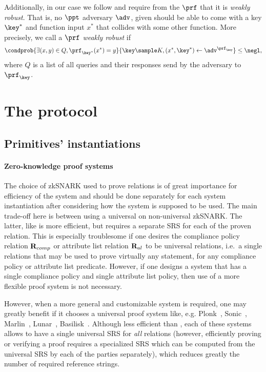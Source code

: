 \documentclass[runningheads,10pt]{llncs}
\numberwithin{equation}{section}
\begin{document}
Additionally, in our case we follow \cite{EPRINT:DGKOS20} and require from the
$\prf$ that it is \emph{weakly robust}. That is, no $\ppt$ adversary $\adv$,
given should be able to come with a key $\key^*$ and function input $x^*$ that
collides with some other function. More precisely, we call a $\prf$ \emph{weakly robust} if
\[
\condprob{\exists (x, y) \in Q, \prf_{\key^*} (x^*) = y}{\key \sample K, (x^*, \key^*) \gets
\adv^{\prf_\key}} \leq \negl,
\]
where $Q$ is a list of all queries and their responses send by the adversary to
$\prf_\key$.

\section{The protocol}
\subsection{Primitives' instantiations}
\paragraph{Zero-knowledge proof systems}

The choice of zkSNARK used to prove relations is of great importance for efficiency
of the system and should be done separately for each system instantiation after
considering how the system is supposed to be used. The main trade-off here is between
using a universal on non-universal zkSNARK. The latter, like \cite{EC:Groth16} is
more efficient, but requires a separate SRS for each of the proven relation. This is
especially troublesome if one desires the compliance policy relation $\mathbf{R}_{comp}$ or
attribute list relation $\mathbf{R}_{al}$ to be universal relations, i.e.~a single
relations that may be used to prove virtually any statement, for any compliance
policy or attribute list predicate. However, if one designs a system that has a
single compliance policy and single attribute list policy, then use of a more
flexible proof system is not necessary.

However, when a more general and customizable system is required, one may greatly
benefit if it chooses a universal proof system like, e.g.
Plonk~\cite{EPRINT:GabWilCio19}, Sonic~\cite{CCS:MBKM19}, Marlin~\cite{EC:CHMMVW20},
Lunar~\cite{EPRINT:CFFQR20}, Basilisk~\cite{C:RafZap21}. Although less efficient than
\cite{EC:Groth16}, each of these systems allows to have a single universal SRS for
\emph{all} relations (however, efficiently proving or verifying a proof requires a
specialized SRS which can be computed from the universal SRS by each of the parties
separately), which reduces greatly the number of required reference strings.
\end{document}
